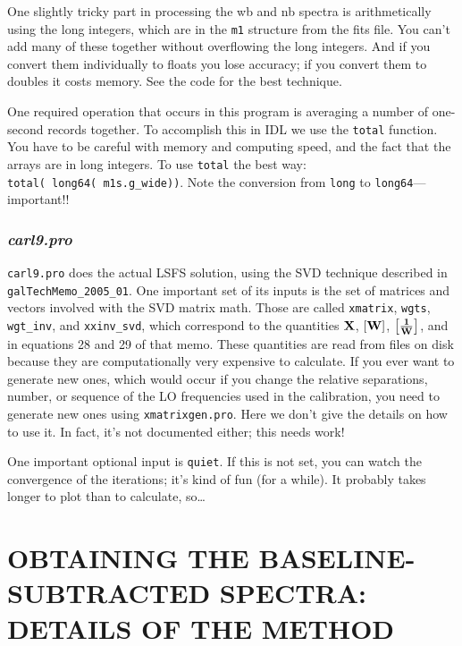\documentclass[psfig,preprint]{aastex}
\begin{document}
	One slightly tricky part in processing the wb and nb spectra is
arithmetically using the long integers, which are in the \verb$m1$
structure from the fits file. You can't add many of these together
without overflowing the long integers. And if you convert
them individually to floats you lose accuracy; if you convert them to
doubles it costs memory. See the code for the best technique.

	One required operation that occurs in this program is averaging
a number of one-second records together. To accomplish this in IDL we
use the \verb$total$ function. You have to be careful with memory and
computing speed, and the fact that the arrays are in long integers. To
use \verb$total$ the best way: \\ \verb$total( long64( m1s.g_wide))$. Note the
conversion from \verb$long$ to \verb$long64$---important!!

\subsubsection{ \it carl9.pro}

	\verb$carl9.pro$ does the actual LSFS solution, using the SVD
technique described in \\ \verb$galTechMemo_2005_01$.  One important set
of its inputs is the set of matrices and vectors involved with the SVD matrix
math.  Those are called \verb$xmatrix$, \verb$wgts$, \verb$wgt_inv$, and
\verb$xxinv_svd$, which correspond to the quantities $\bf X$, $\bf [W]$,
$\bf { \left[1 \over W \right]}$, and {} in
equations 28 and 29 of that memo.  These quantities are read from files on
disk because they are computationally very expensive to calculate. 
If you ever want to generate new ones, which would occur if you change
the relative separations, number, or sequence of the LO frequencies used
in the calibration, you need to generate new ones using
\verb$xmatrixgen.pro$.  Here we don't give the details on how to use it. 
In fact, it's not documented either; this needs work!

	One important optional input is \verb$quiet$. If this is not
set, you can watch the convergence of the iterations; it's kind of fun
(for a while). It probably takes longer to plot than to calculate,
so\dots

\section{ OBTAINING THE BASELINE-SUBTRACTED SPECTRA: DETAILS OF THE METHOD}
\end{document}
